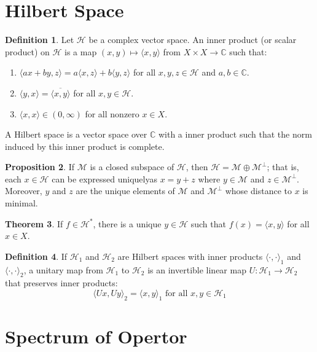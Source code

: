 \documentclass[12pt,a4paper]{book}
\newcommand{\bb}[1]{\mathbb{#1}}
\newenvironment{enu}{\begin{enumerate}[(1)]}{\end{enumerate}}
\theoremstyle{definition}
\newtheorem{defn}{Definition}[section]
\newtheorem{theo}[defn]{Theorem}
\newtheorem{prop}[defn]{Proposition}
\begin{document}
\section{Hilbert Space}
\begin{defn}
    Let $\mathcal{H}$ be a complex vector space. An inner product (or scalar product) on $\mathcal{H}$ is a map $(x, y) \mapsto\langle x, y\rangle$ from $X \times X \rightarrow \mathbb{C}$ such that:
\begin{enu} 
    \item $\langle a x+b y, z\rangle=a\langle x, z\rangle+b\langle y, z\rangle$ for all $x, y, z \in \mathcal{H}$ and $a, b \in \mathbb{C}$.
    \item $\langle y, x\rangle=\overline{\langle x, y\rangle}$ for all $x, y \in \mathcal{H}$.
    \item $\langle x, x\rangle \in(0, \infty)$ for all nonzero $x \in X$.
\end{enu}
A Hilbert space is a vector space over $\bb{C}$ with a inner product such that the norm induced by this inner product is complete.
\end{defn}
\begin{prop}
    If $\mathcal{M}$ is a closed subspace of $\mathcal{H}$, then $\mathcal{H}=\mathcal{M} \oplus \mathcal{M}^{\perp}$; that is, each $x \in \mathcal{H}$ can be expressed uniquelyas $x=y+z$ where $y \in \mathcal{M}$ and $z \in \mathcal{M}^{\perp}$. Moreover, $y$ and $z$ are the unique elements of $\mathcal{M}$ and $\mathcal{M}^{\perp}$ whose distance to $x$ is minimal.
\end{prop}
\begin{theo}
    If $f \in \mathcal{H}^*$, there is a unique $y \in \mathcal{H}$ such that $f(x)=\langle x, y\rangle$ for all $x \in X$.
\end{theo}
\begin{defn}
    If $\mathcal{H}_1$ and $\mathcal{H}_2$ are Hilbert spaces with inner products $\langle\cdot, \cdot\rangle_1$ and $\langle\cdot, \cdot\rangle_2$, a unitary map from $\mathcal{H}_1$ to $\mathcal{H}_2$ is an invertible linear map $U: \mathcal{H}_1 \rightarrow \mathcal{H}_2$ that preserves inner products:
    $$
    \langle U x, U y\rangle_2=\langle x, y\rangle_1 \text { for all } x, y \in \mathcal{H}_1
    $$
\end{defn}


\section{Spectrum of Opertor}
\end{document}
